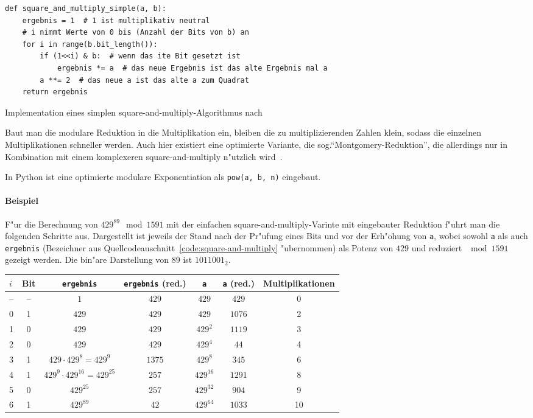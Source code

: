 \documentclass[12pt]{article}
\begin{document}
\begin{code-snip}
\begin{lstlisting}
def square_and_multiply_simple(a, b):
    ergebnis = 1  # 1 ist multiplikativ neutral
    # i nimmt Werte von 0 bis (Anzahl der Bits von b) an
    for i in range(b.bit_length()):
        if (1<<i) & b:  # wenn das ite Bit gesetzt ist
            ergebnis *= a  # das neue Ergebnis ist das alte Ergebnis mal a
        a **= 2  # das neue a ist das alte a zum Quadrat
    return ergebnis
\end{lstlisting}
\caption{Implementation eines simplen square-and-multiply-Algorithmus nach~\cite{hac}}
\label{code:square-and-multiply}
\end{code-snip}

Baut man die modulare Reduktion in die Multiplikation ein,
bleiben die zu multiplizierenden Zahlen klein, sodass die einzelnen
Multiplikationen schneller werden.
Auch hier existiert eine optimierte Variante, die sog.\@ "`Montgomery-Reduktion"',
die allerdings nur in Kombination mit einem komplexeren square-and-multiply n"utzlich wird~\cite{hac}.

In Python ist eine optimierte modulare Exponentiation als \lstinline{pow(a, b, n)} eingebaut.

\paragraph{Beispiel}
F"ur die Berechnung von $429^{89} \mod 1591$ mit der einfachen square-and-multiply-Varinte
mit eingebauter Reduktion f"uhrt man die folgenden Schritte aus.
Dargestellt ist jeweils der Stand nach der Pr"ufung eines Bits und vor der Erh"ohung von \texttt{a},
wobei sowohl \texttt{a} als auch \texttt{ergebnis} (Bezeichner aus Quellcodeauschnitt~\ref{code:square-and-multiply} "ubernommen)
als Potenz von $429$ und reduziert $\mod 1591$ gezeigt werden.
Die bin"are Darstellung von $89$ ist $1011001_2$. \\

\begin{tabular}{l|c c c c c c}
    $i$ & Bit & \texttt{ergebnis} & \texttt{ergebnis} (red.\@) & \texttt{a} & \texttt{a} (red.\@) & Multiplikationen\\
    \hline
    \hline
    -- & -- & $1$ & $429$ & $429$ & $429$ & 0 \\
    \hline
    0 & 1 & $429$ & $429$ & $429$ & $1076$ & 2 \\
    1 & 0 & $429$ & $429$ & $429^2$ & $1119$ & 3 \\
    2 & 0 & $429$ & $429$ & $429^4$ & $44$ & 4 \\
    3 & 1 & $429 \cdot 429^8 = 429^9$ & $1375$ & $429^8$ & $345$ & 6 \\
    4 & 1 & $429^9 \cdot 429^{16} = 429^{25}$ & $257$ & $429^{16}$ & $1291$ & 8 \\
    5 & 0 & $429^{25}$ & $257$ & $429^{32}$ & $904$ & 9 \\
    6 & 1 & $429^{89}$ & $42$ & $429^{64}$ & $1033$ & 10 \\
\end{tabular}
\end{document}
